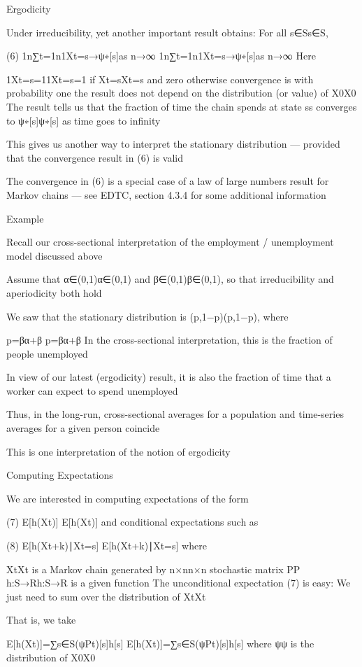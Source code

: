 Ergodicity

Under irreducibility, yet another important result obtains: For all s∈Ss∈S,

(6)
1n∑t=1n1{Xt=s}→ψ∗[s]as n→∞
1n∑t=1n1{Xt=s}→ψ∗[s]as n→∞
Here

1{Xt=s}=11{Xt=s}=1 if Xt=sXt=s and zero otherwise
convergence is with probability one
the result does not depend on the distribution (or value) of X0X0
The result tells us that the fraction of time the chain spends at state ss converges to ψ∗[s]ψ∗[s] as time goes to infinity

This gives us another way to interpret the stationary distribution — provided that the convergence result in (6) is valid

The convergence in (6) is a special case of a law of large numbers result for Markov chains — see EDTC, section 4.3.4 for some additional information

Example

Recall our cross-sectional interpretation of the employment / unemployment model discussed above

Assume that α∈(0,1)α∈(0,1) and β∈(0,1)β∈(0,1), so that irreducibility and aperiodicity both hold

We saw that the stationary distribution is (p,1−p)(p,1−p), where

p=βα+β
p=βα+β
In the cross-sectional interpretation, this is the fraction of people unemployed

In view of our latest (ergodicity) result, it is also the fraction of time that a worker can expect to spend unemployed

Thus, in the long-run, cross-sectional averages for a population and time-series averages for a given person coincide

This is one interpretation of the notion of ergodicity

Computing Expectations

We are interested in computing expectations of the form

(7)
E[h(Xt)]
E[h(Xt)]
and conditional expectations such as

(8)
E[h(Xt+k)∣Xt=s]
E[h(Xt+k)∣Xt=s]
where

{Xt}{Xt} is a Markov chain generated by n×nn×n stochastic matrix PP
h:S→Rh:S→R is a given function
The unconditional expectation (7) is easy: We just need to sum over the distribution of XtXt

That is, we take

E[h(Xt)]=∑s∈S(ψPt)[s]h[s]
E[h(Xt)]=∑s∈S(ψPt)[s]h[s]
where ψψ is the distribution of X0X0

